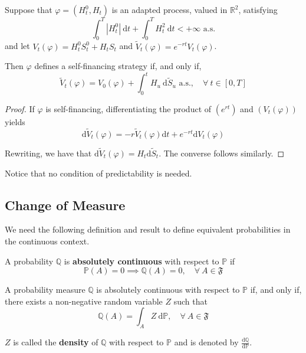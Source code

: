 \begin{proposition}\label{prop:4.1.2}
    Suppose that $\varphi = (H_t^0, H_t)$ is an adapted process, valued in $\mathbb{R}^2$, satisfying \[ \int_0^T |H_t^0| ~\mathrm{d}t + \int_0^T H_t^2 ~\mathrm{d}t < + \infty \text{ a.s.} \]
    and let $V_t(\varphi) = H_t^0 S_t^0 + H_t S_t$ and $\tilde{V}_t(\varphi) = e^{-rt}V_t(\varphi)$.

    Then $\varphi$ defines a self-financing strategy if, and only if, 
    \[
        \tilde{V}_t(\varphi) = V_0(\varphi) + \int_0^t H_u ~\mathrm{d}\tilde{S}_u \text{ a.s.}, \quad \forall ~t \in [0, T]
    \]
\end{proposition}

\begin{proof}
    If $\varphi$ is self-financing, differentiating the product of $(e^{rt})$ and $(V_t(\varphi))$ yields
    \[
        \mathrm{d}\tilde{V}_t(\varphi) = -r \tilde{V}_t(\varphi) \mathrm{d}t + e^{-rt} \mathrm{d}V_t(\varphi)
    \]

    Rewriting, we have that $\mathrm{d}\tilde{V}_t(\varphi) = H_t \mathrm{d}\tilde{S}_t$. The converse follows similarly.
\end{proof}

Notice that no condition of predictability is needed.

\subsection{Change of Measure}

We need the following definition and result to define equivalent probabilities in the continuous context.

\begin{definition}
    A probability $\mathbb{Q}$ is \textbf{absolutely continuous} with respect to $\mathbb{P}$ if 
    \[
        \mathbb{P}(A) = 0 \implies \mathbb{Q}(A) = 0, \quad \forall~ A \in \mathfrak{F}
    \]
\end{definition}

\begin{theorem}
    A probability measure $\mathbb{Q}$ is absolutely continuous with respect to $\mathbb{P}$ if, and only if, there exists a non-negative random variable $Z$ such that 
    \[
        \mathbb{Q}(A) = \int_A Z ~\mathrm{d}\mathbb{P}, \quad \forall~ A \in \mathfrak{F}
    \]

    $Z$ is called the \textbf{density} of $\mathbb{Q}$ with respect to $\mathbb{P}$ and is denoted by $\frac{\mathrm{d} \mathbb{Q}}{\mathrm{d} \mathbb{P}}$.
\end{theorem}

